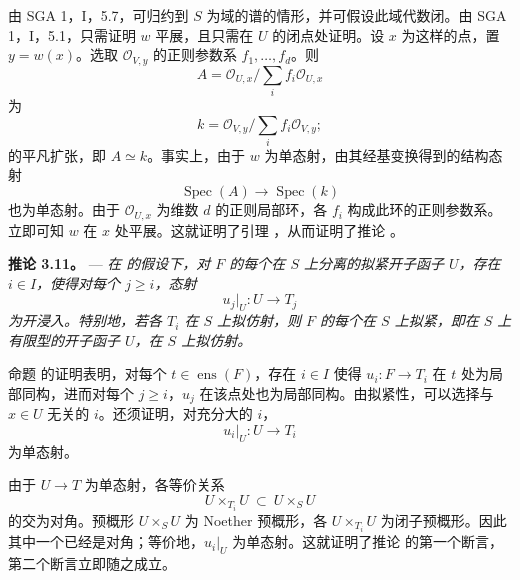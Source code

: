 由 SGA 1，I，5.7，可归约到 \(S\) 为域的谱的情形，并可假设此域代数闭。由 SGA 1，I，5.1，只需证明 \(w\) 平展，且只需在 \(U\) 的闭点处证明。设 \(x\) 为这样的点，置 \(y=w(x)\)。选取 \(\mathscr O_{V,y}\) 的正则参数系 \(f_1,\ldots,f_d\)。则 \[
  A=
  \mathscr O_{U,x}\big/\sum_i f_i\mathscr O_{U,x}
\] 为 \[
  k=
  \mathscr O_{V,y}\big/\sum_i f_i\mathscr O_{V,y};
\] 的平凡扩张，即 \(A\simeq k\)。事实上，由于 \(w\) 为单态射，由其经基变换得到的结构态射 \[
  \operatorname{Spec}(A)\longrightarrow\operatorname{Spec}(k)
\] 也为单态射。由于 \(\mathscr O_{U,x}\) 为维数 \(d\) 的正则局部环，各 \(f_i\) 构成此环的正则参数系。立即可知 \(w\) 在 \(x\) 处平展。这就证明了引理 ，从而证明了推论 。

\medskip\noindent{}\textbf{推论 3.11。} --- \textit{在  的假设下，对 \(F\) 的每个在 \(S\) 上分离的拟紧开子函子 \(U\)，存在 \(i\in I\)，使得对每个 \(j\geq i\)，态射 \[
  u_j|_U:U\longrightarrow T_j
\] 为开浸入。特别地，若各 \(T_i\) 在 \(S\) 上拟仿射，则 \(F\) 的每个在 \(S\) 上拟紧，即在 \(S\) 上有限型的开子函子 \(U\)，在 \(S\) 上拟仿射。}

命题  的证明表明，对每个 \(t\in\operatorname{ens}(F)\)，存在 \(i\in I\) 使得 \(u_i:F\to T_i\) 在 \(t\) 处为局部同构，进而对每个 \(j\geq i\)，\(u_j\) 在该点处也为局部同构。由拟紧性，可以选择与 \(x\in U\) 无关的 \(i\)。还须证明，对充分大的 \(i\)，\[
  u_i|_U:U\longrightarrow T_i
\] 为单态射。

由于 \(U\to T\) 为单态射，各等价关系 \[
  U\times_{T_i}U\ \subset\ U\times_S U
\] 的交为对角。预概形 \(U\times_S U\) 为 Noether 预概形，各 \(U\times_{T_i}U\) 为闭子预概形。因此其中一个已经是对角；等价地，\(u_i|_U\) 为单态射。这就证明了推论  的第一个断言，第二个断言立即随之成立。


